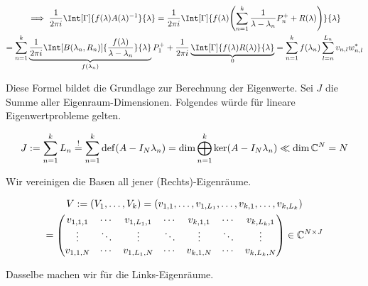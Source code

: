 \begin{multline*}
    \implies
    \frac{1}{2 \pi i}
    \Int[\Gamma]
    {
        f(\lambda) A(\lambda)^{-1}
    }{\lambda}
    =
    \frac{1}{2 \pi i}
    \Int[\Gamma]
    {
        f(\lambda)
        \pbraces
        {
            \sum_{n=1}^k
                \frac{1}{\lambda - \lambda_n} P_n^+
                +
                R(\lambda)
        }
    }{\lambda} \\
    =
    \sum_{n=1}^k
        \underbrace
        {
            \frac{1}{2 \pi i}
            \Int[B(\lambda_n, R_n)]
            {
                \frac{f(\lambda)}{\lambda - \lambda_n}
            }{\lambda}
        }_{f(\lambda_n)}
        P_1^+
    +
    \frac{1}{2 \pi i}
    \underbrace
    {
        \Int[\Gamma]
        {
            f(\lambda) R(\lambda)
        }{\lambda}
    }_0
    =
    \sum_{n=1}^k
        f(\lambda_n)
        \sum_{l=n}^{L_n}
            v_{n, l} w_{n, l}^\ast
\end{multline*}

Diese Formel bildet die Grundlage zur Berechnung der Eigenwerte.
Sei $J$ die Summe aller Eigenraum-Dimensionen.
Folgendes würde für lineare Eigenwertprobleme gelten.

\begin{align*}
    J
    :=
    \sum_{n=1}^k
        L_n
    \stackrel{!}{=}
    \sum_{n=1}^k
        \operatorname{def}(A - I_N \lambda_n)
    =
    \dim
    \bigoplus_{n=1}^k
        \ker(A - I_N \lambda_n)
    \ll
    \dim \mathbb{C}^N
    =
    N
\end{align*}

Wir vereinigen die Basen all jener (Rechts)-Eigenräume.

\begin{multline*}
    V
    :=
    (V_1, \dots, V_k)
    =
    (v_{1, 1}, \dots, v_{1, L_1}, \dots, v_{k, 1}, \dots, v_{k, L_k}) \\
    =
    \begin{pmatrix}
        v_{1, 1, 1} & \cdots & v_{1, L_1, 1} & \cdots & v_{k, 1, 1} & \cdots & v_{k, L_k, 1} \\
        \vdots      & \ddots & \vdots        & \ddots & \vdots      & \ddots & \vdots        \\
        v_{1, 1, N} & \cdots & v_{1, L_1, N} & \cdots & v_{k, 1, N} & \cdots & v_{k, L_k, N}
    \end{pmatrix}
    \in
    \mathbb{C}^{N \times J}
\end{multline*}

Dasselbe machen wir für die Links-Eigenräume.

